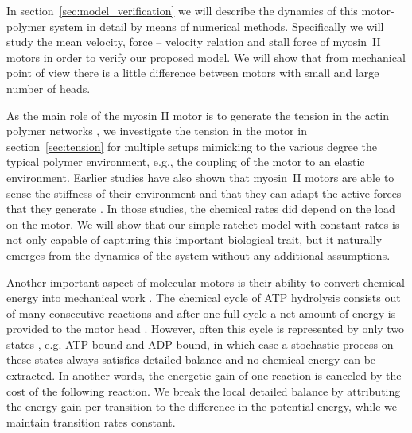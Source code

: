 \documentclass[aps,pre,twocolumn,showpacs,showkeys,superscriptaddress,floatfix]{revtex4-1}
\begin{document}
In section~\ref{sec:model_verification} we will describe the dynamics of this motor-polymer system in detail by means of numerical methods.
Specifically we will study the mean velocity, force -- velocity relation and stall force of myosin~II motors in order to verify our proposed model. 
We will show that from mechanical point of view there is a little difference between motors with small and large number of heads. 

As the main role of the myosin II motor is to generate the tension in the actin polymer networks \cite{ma2012nonmuscle,chugh2017actin,monier2010actomyosin}, 
we investigate the tension in the motor in section~\ref{sec:tension} for multiple setups mimicking to the various degree the typical polymer environment, 
e.g., the coupling of the motor to an elastic environment.
Earlier studies have also shown that myosin~II motors are able to sense the stiffness of their environment and that they can adapt the active forces that they generate \cite{stam2015isoforms,Albert2014}.
In those studies, the chemical rates did depend on the load on the motor. 
We will show that our simple ratchet model with constant rates is not only capable of capturing this important biological trait, 
but it naturally emerges from the dynamics of the system without any additional assumptions.

Another important aspect of molecular motors is their ability to convert chemical energy into mechanical work \cite{astumian1996mechanochemical}.
The chemical cycle of ATP hydrolysis consists out of many consecutive reactions and after one full cycle a net amount of energy is provided to the motor head \cite{gajewski1986thermodynamics}.
However, often this cycle is represented by only two states \cite{julicher1997modeling,Reimann2002introduction}, e.g. ATP bound and ADP bound, 
in which case a stochastic process on these states always satisfies detailed balance and no chemical energy can be extracted. 
In another words, the energetic gain of one reaction is canceled by the cost of the following reaction.
We break the local detailed balance by attributing the energy gain per transition to the difference in the potential energy, while we maintain transition rates constant. 
\end{document}
